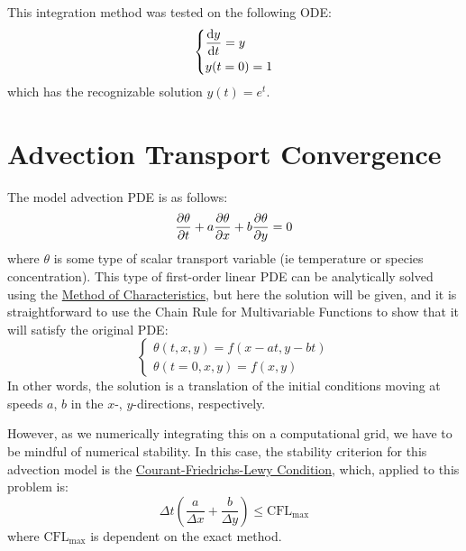 \documentclass[10pt, reqno]{amsart}
\begin{document}
\begin{multicols}{2}
This integration method was tested on the following ODE: 
\begin{equation}
    \begin{dcases}
        \frac{\dd y}{\dd t} = y \\
        y(t = 0) = 1
    \end{dcases}
\end{equation}
which has the recognizable solution $y(t) = e^t$.

\section*{Advection Transport Convergence}
The model advection PDE is as follows:
\begin{equation}
    \pdv{\theta}{t} + a \pdv{\theta}{x} + b \pdv{\theta}{y} = 0
\end{equation}
where $\theta$ is some type of scalar transport variable (ie temperature or species concentration). This type of first-order linear PDE can be analytically solved using the \href{https://en.wikipedia.org/wiki/Method_of_characteristics}{Method of Characteristics}, but here the solution will be given, and it is straightforward to use the Chain Rule for Multivariable Functions to show that it will satisfy the original PDE:
\begin{equation}
    \begin{cases}
        \theta(t, x, y) = f(x - at, y - bt) \\
        \theta(t = 0, x, y) = f(x, y)
    \end{cases}
\end{equation}
In other words, the solution is a translation of the initial conditions moving at speeds $a$, $b$ in the $x$-, $y$-directions, respectively.

However, as we numerically integrating this on a computational grid, we have to be mindful of numerical stability. In this case, the stability criterion for this advection model is the \href{https://en.wikipedia.org/wiki/Courant%E2%80%93Friedrichs%E2%80%93Lewy_condition}{Courant-Friedrichs-Lewy Condition}, which, applied to this problem is:
\begin{equation}
    \Delta t \left( \frac{a}{\Delta x} + \frac{b}{\Delta y} \right) \leq \mathrm{CFL}_\mathrm{max}
\end{equation}
where $\mathrm{CFL}_\mathrm{max}$ is dependent on the exact method.


\end{multicols}
\end{document}

